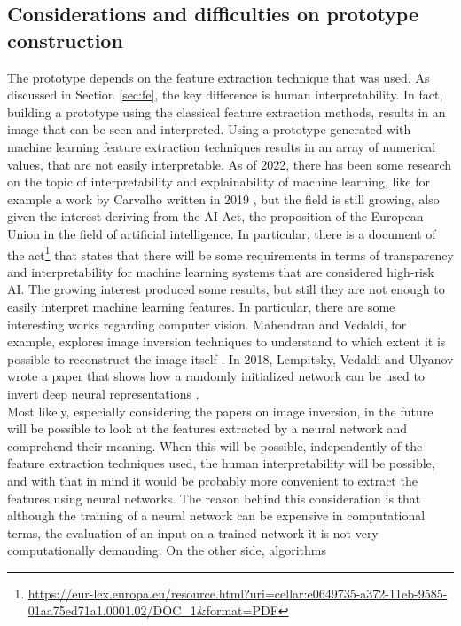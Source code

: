 \documentclass[conference]{IEEEtran}
\begin{document}
		
		\subsection{Considerations and difficulties on prototype construction\label{sec:cpc}}
		
			\noindent The prototype depends on the feature extraction technique that was used. As discussed in Section \ref{sec:fe}, the key difference is human interpretability. In fact, building a prototype using the 
			classical feature extraction methods, results in an image that can be seen and interpreted. Using a prototype generated with machine learning feature extraction techniques results in an array 
			of numerical values, that are not easily interpretable. As of 2022, there has been some research on the topic of interpretability and explainability of machine learning, like for example 
			a work by Carvalho written in 2019 \cite{electronics8080832}, 
			but the field is still growing, also given the interest deriving from the AI-Act, the proposition of the European Union in the field of artificial intelligence. In particular, there is a document of 
			the act\footnote{\url{https://eur-lex.europa.eu/resource.html?uri=cellar:e0649735-a372-11eb-9585-01aa75ed71a1.0001.02/DOC_1&format=PDF}} that states that there will be some requirements in terms of 
			transparency and interpretability for machine learning systems that are considered high-risk AI. The growing interest produced some results, but still they are not enough to easily interpret machine learning 
			features. In particular, there are some interesting works regarding computer vision. Mahendran and Vedaldi, for example, explores image inversion techniques to understand to which extent it is possible to 
			reconstruct the image itself \cite{mahendran2015understanding}. In 2018, Lempitsky, Vedaldi and Ulyanov wrote a paper that shows how a randomly initialized network can be used to invert 
			deep neural representations \cite{8579082}.\\
			Most likely, especially considering the papers on image inversion,
			in the future will be possible to look at the features extracted by a neural network and comprehend their meaning. When this will be possible, independently of the feature extraction techniques 
			used, the human interpretability will be possible, and with that in mind it would be probably more convenient to extract the features using neural networks. The reason behind this consideration is 
			that although the training of a neural network can be expensive in computational terms, the evaluation of an input on a trained network it is not very computationally demanding. On the other side, algorithms 
\end{document}
